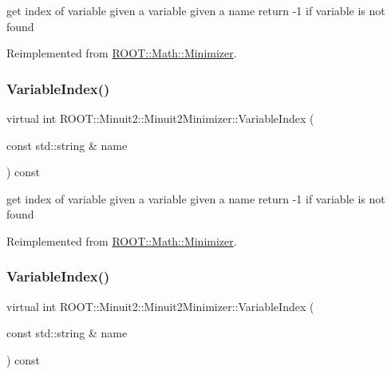 get index of variable given a variable given a name return -\/1 if variable is not found 

Reimplemented from \mbox{\hyperlink{classROOT_1_1Math_1_1Minimizer_a5f7ff3bdda1f4b1d9e5e1150091a86c5}{R\+O\+O\+T\+::\+Math\+::\+Minimizer}}.

\mbox{\label{classROOT_1_1Minuit2_1_1Minuit2Minimizer_a93839e851d16fff50898af2159d8863d}} 
\subsubsection{\texorpdfstring{VariableIndex()}{VariableIndex()}\hspace{0.1cm}{\footnotesize\ttfamily [2/3]}}
{\footnotesize\ttfamily virtual int R\+O\+O\+T\+::\+Minuit2\+::\+Minuit2\+Minimizer\+::\+Variable\+Index (\begin{DoxyParamCaption}\item[{const std\+::string \&}]{name }\end{DoxyParamCaption}) const\hspace{0.3cm}{\ttfamily [virtual]}}

get index of variable given a variable given a name return -\/1 if variable is not found 

Reimplemented from \mbox{\hyperlink{classROOT_1_1Math_1_1Minimizer_a5f7ff3bdda1f4b1d9e5e1150091a86c5}{R\+O\+O\+T\+::\+Math\+::\+Minimizer}}.

\mbox{\label{classROOT_1_1Minuit2_1_1Minuit2Minimizer_a93839e851d16fff50898af2159d8863d}} 
\subsubsection{\texorpdfstring{VariableIndex()}{VariableIndex()}\hspace{0.1cm}{\footnotesize\ttfamily [3/3]}}
{\footnotesize\ttfamily virtual int R\+O\+O\+T\+::\+Minuit2\+::\+Minuit2\+Minimizer\+::\+Variable\+Index (\begin{DoxyParamCaption}\item[{const std\+::string \&}]{name }\end{DoxyParamCaption}) const\hspace{0.3cm}{\ttfamily [virtual]}}

